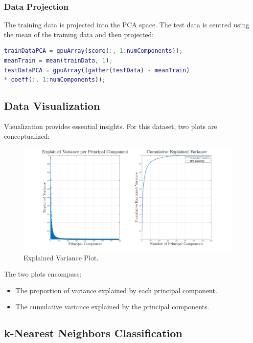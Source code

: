 \subsubsection{Data Projection}

The training data is projected into the PCA space. The test data is centred using the mean of the training data and then projected:
\begin{lstlisting}[language=Matlab]
trainDataPCA = gpuArray(score(:, 1:numComponents));
meanTrain = mean(trainData, 1);
testDataPCA = gpuArray((gather(testData) - meanTrain)
* coeff(:, 1:numComponents));
\end{lstlisting}

\subsection{Data Visualization}

Visualization provides essential insights. For this dataset, two plots are conceptualized:
\begin{figure}[h]
    \centering
    \includegraphics[width=1\textwidth]{PCA_KNN.jpg}
    \caption{Explained Variance Plot.}
    \label{fig:explained_variance} 
\end{figure}

The two plots encompass:
\begin{itemize}
    \item The proportion of variance explained by each principal component.
    \item The cumulative variance explained by the principal components.
\end{itemize}

\subsection{k-Nearest Neighbors Classification}

